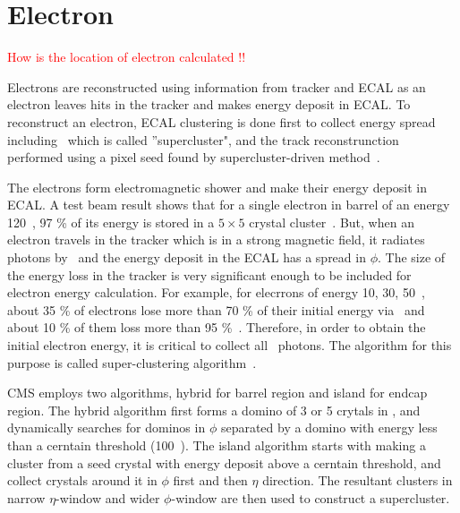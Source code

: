 \section{ Electron }

\textcolor{red}{How is the location of electron calculated !!}

Electrons are reconstructed using information from tracker and ECAL 
as an electron leaves hits in the tracker and makes energy deposit in ECAL.
To reconstruct an electron, ECAL clustering is done first to collect energy 
spread including \brem\ which is called ''supercluster", 
and the track reconstrunction performed using a pixel seed found 
by supercluster-driven method~\cite{Baffioni:2006cd}.  
 
The electrons form electromagnetic shower and make their energy deposit in ECAL. 
A test beam result shows that for a single electron in barrel of an energy 120~\GeV, 
97 \%  of its energy is stored in a $5\times5$ crystal cluster~\cite{Baffioni:2006cd}. 
But, when an electron travels in the tracker which is in a strong magnetic field, 
it radiates photons by \brem\ and the energy deposit 
in the ECAL has a spread in $\phi$. The size of the energy loss in the tracker 
is very significant enough to be included for electron energy calculation. 
For example, for elecrrons of energy 10, 30, 50~\GeV, about 35 \% of electrons 
lose more than 70 \% of their initial energy via \brem\ and about 10 \% of them 
loss more than 95 \%~\cite{Baffioni:2006cd}. Therefore, in order to 
obtain the initial electron energy, it is critical to collect all \brem\ photons.
The algorithm for this purpose is called super-clustering algorithm~\cite{Baffioni:2006cd}.

CMS employs two algorithms, hybrid for barrel region and island for endcap region. 
The hybrid algorithm first forms a domino of 3 or 5 crytals in \Eta, and
dynamically searches for dominos in $\phi$ separated by a domino with energy less 
than a cerntain threshold (100~\MeV).
The island algorithm starts with making a cluster from a seed crystal with energy deposit 
above a cerntain threshold, and collect crystals around it in $\phi$ first and then $\eta$ direction. 
The resultant clusters in narrow $\eta$-window and wider $\phi$-window 
are then used to construct a supercluster.

